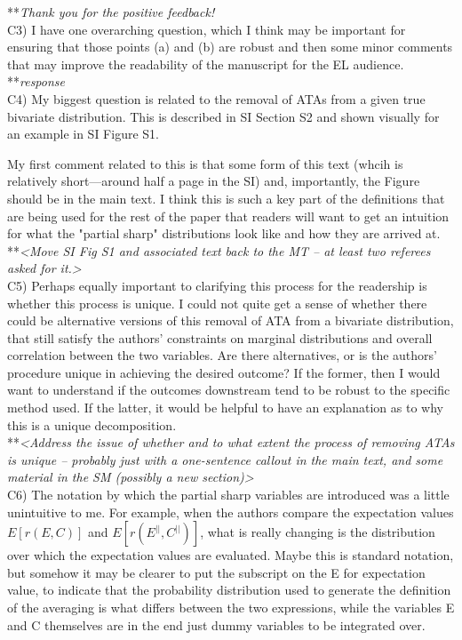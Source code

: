 \documentclass[letterpaper,11pt]{article}
\begin{document}
\noindent ***\emph{Thank you for the positive feedback!} \\

\noindent C3) I have one overarching question, which I think may be important for ensuring that those points (a) and (b) are robust and then some minor comments that may improve the readability of the manuscript for the EL audience. \\

\noindent ***\emph{response} \\

\noindent C4) My biggest question is related to the removal of ATAs from a given true bivariate distribution.  This is described in SI Section S2 and shown visually for an example in SI Figure S1. 

My first comment related to this is that some form of this text (whcih is relatively short---around half a page in the SI) and, importantly, the Figure should be in the main text.  I think this is such a key part of the definitions that are being used for the rest of the paper that readers will want to get an intuition for what the "partial sharp" distributions look like and how they are arrived at. \\

\noindent ***\emph{<Move SI Fig S1 and associated text back to the MT – at least two referees asked for it.>} \\

\noindent C5) Perhaps equally important to clarifying this process for the readership is whether this process is unique. I could not quite get a sense of whether there could be alternative versions of this removal of ATA from a bivariate distribution, that still satisfy the authors' constraints on marginal distributions and overall correlation between the two variables. Are there alternatives, or is the authors' procedure unique in achieving the desired outcome?  If the former, then I would want to understand if the outcomes downstream tend to be robust to the specific method used. If the latter, it would be helpful to have an explanation as to why this is a unique decomposition. \\

\noindent ***\emph{<Address the issue of whether and to what extent the process of removing ATAs is unique – probably just with a one-sentence callout in the main text, and some material in the SM (possibly a new section)>} \\

\noindent C6) The notation by which the partial sharp variables are introduced was a little unintuitive to me.  For example, when the authors compare the expectation values 
$E[r(E,C)]$ and $E[r(E^{||},C^{||})]$, what is really changing is the distribution over which the expectation values are evaluated.  Maybe this is standard notation, but somehow it may be clearer to put the subscript on the E for expectation value, to indicate that the probability distribution used to generate the definition of the averaging is what differs between the two expressions, while the variables E and C themselves are in the end just dummy variables to be integrated over.  \\
\end{document}
